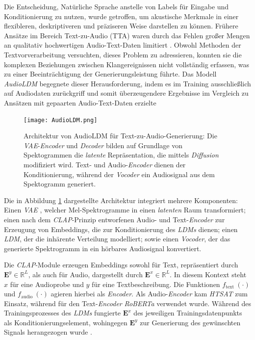 \documentclass[
  a4paper,  %
  twoside,  %
  bibliography=totoc,
  headsepline,
  cleardoublepage=empty,
  parskip=half,
  draft=false
]{scrbook}
\begin{document}
{Die Entscheidung, Natürliche Sprache anstelle von Labels für Eingabe und Konditionierung zu nutzen, wurde getroffen, um akustische Merkmale in einer flexibleren, deskriptiveren und präziseren Weise darstellen zu können. Frühere Ansätze im Bereich Text-zu-Audio (TTA) waren durch das Fehlen großer Mengen an qualitativ hochwertigen Audio-Text-Daten limitiert \cite{liu_separate_2022}. Obwohl Methoden der Textvorverarbeitung \cite{gemmeke_audio_2017, yang_diffsound_2023} versuchten, dieses Problem zu adressieren, konnten sie die komplexen Beziehungen zwischen Klangereignissen nicht vollständig erfassen, was zu einer Beeinträchtigung der Generierungsleistung führte. Das Modell \emph{AudioLDM} begegnete dieser Herausforderung, indem es im Training ausschließlich auf Audiodaten zurückgriff und somit überzeugendere Ergebnisse im Vergleich zu Ansätzen mit gepaarten Audio-Text-Daten erzielte \cite{liu_audioldm_2023}


\begin{figure}[h]
  \centering
  \texttt{[image: AudioLDM.png]}
  \caption[AudioLDM Architektur]{Architektur von AudioLDM für Text-zu-Audio-Generierung: Die \emph{VAE}-\emph{Encoder} und \emph{Decoder} bilden auf Grundlage von Spektogrammen die \emph{latente} Repräsentation, die mittels \emph{Diffusion} modifiziert wird. Text- und Audio-\emph{Encoder} dienen der Konditionierung, während der \emph{Vocoder} ein Audiosignal aus dem Spektogramm generiert. \cite{liu_audioldm_2023}}
  \label{fig:AudioLDM}
\end{figure} 

Die in Abbildung \ref{fig:AudioLDM} dargestellte Architektur integriert mehrere Komponenten: Einen \emph{VAE} \cite{kingma_auto-encoding_2022}, welcher Mel-Spektrogramme in einen \emph{latenten} Raum transformiert; einen nach dem \emph{CLAP}-Prinzip \cite{wu_large-scale_2023} entworfenen Audio- und Text-\emph{Encoder} zur Erzeugung von Embeddings, die zur Konditionierung des \emph{LDMs} dienen; einen \emph{LDM}, der die inhärente Verteilung modelliert; sowie einen \emph{Vocoder}, der das generierte Spektrogramm in ein hörbares Audiosignal konvertiert. \cite{liu_audioldm_2023}

Die \emph{CLAP}-Module erzeugen Embeddings sowohl für Text, repräsentiert durch $\boldsymbol{E}^y \in \mathbb{R}^L$, als auch für Audio, dargestellt durch $\boldsymbol{E}^x \in \mathbb{R}^L$. In diesem Kontext steht $x$ für eine Audioprobe und $y$ für eine Textbeschreibung. Die Funktionen $f_{\text {text }}(\cdot)$ und $f_{\text {audio }}(\cdot)$ agieren hierbei als \emph{Encoder}. Als Audio-\emph{Encoder} kam \emph{HTSAT} \cite{chen_hts-at_2022} zum Einsatz, während für den Text-\emph{Encoder} \emph{RoBERTa} \cite{liu_roberta_2019} verwendet wurde. Während des Trainingsprozesses des \emph{LDMs} fungierte $\boldsymbol{E}^x$ des jeweiligen Trainingsdatenpunkts als Konditionierungselement, wohingegen $\boldsymbol{E}^y$ zur Generierung des gewünschten Signals herangezogen wurde \cite{liu_audioldm_2023}.

}
\end{document}
